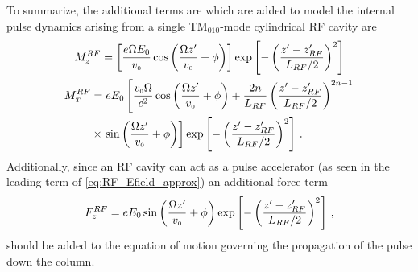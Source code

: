 To summarize, the additional terms are which are added to model the internal pulse dynamics arising from a single TM$_{010}$-mode cylindrical RF cavity are
\begin{gather}
  M_{z}^{RF} = \left [ \frac{ e \Omega E_{0} }{ v_{{\scriptscriptstyle 0}} } \cos \left ( \frac{ \Omega z^{\prime} }{ v_{{\scriptscriptstyle 0}} } + \phi \right ) \right ] \exp \left [ - \left (  \frac{ z^{\prime} - z_{RF}^{\prime} }{ L_{RF} / 2 } \right )^{ 2 } \right ] \\
  \begin{aligned}
  M_{{\scriptscriptstyle T}}^{RF} &= e E_{0} \left [ \frac{ v_{{\scriptscriptstyle 0}} \Omega }{c^{2}} \cos \left ( \frac{ \Omega z^{\prime} }{ v_{{\scriptscriptstyle 0}} } + \phi \right ) + \frac{2 n}{L_{RF}} \left ( \frac{z^{\prime} - z^{\prime}_{RF}}{L_{RF} / 2} \right )^{2 n - 1} \right. \\ & \times \left. \sin \left ( \frac{ \Omega z^{\prime} }{ v_{{\scriptscriptstyle 0}} } + \phi \right )
   \right ] \exp \left [ - \left (  \frac{ z^{\prime} - z_{RF}^{\prime} }{ L_{RF} / 2 } \right )^{ 2 } \right ] \,\text{.}
  \end{aligned}
\end{gather}
Additionally, since an RF cavity can act as a pulse accelerator (as seen in the leading term of \ref{eq:RF_Efield_approx}) an additional force term
\begin{equation}
  F_{z}^{RF} = e E_{0} \sin \left ( \frac{ \Omega z^{\prime} }{ v_{{\scriptscriptstyle 0}} } + \phi \right ) \exp \left [ - \left (  \frac{ z^{\prime} - z_{RF}^{\prime} }{ L_{RF} / 2 } \right )^{ 2 } \right ] \, \text{,}
\end{equation}
should be added to the equation of motion governing the propagation of the pulse down the column.

